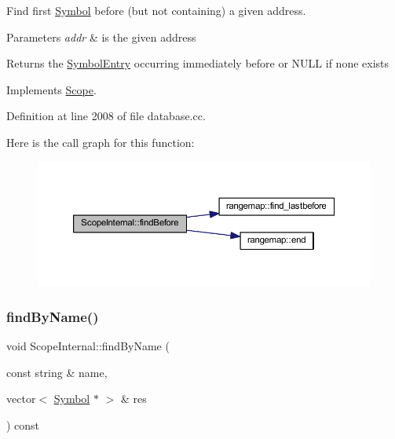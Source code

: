 Find first \mbox{\hyperlink{class_symbol}{Symbol}} before (but not containing) a given address. 


\begin{DoxyParams}{Parameters}
{\em addr} & is the given address \\
\hline
\end{DoxyParams}
\begin{DoxyReturn}{Returns}
the \mbox{\hyperlink{class_symbol_entry}{Symbol\+Entry}} occurring immediately before or N\+U\+LL if none exists 
\end{DoxyReturn}


Implements \mbox{\hyperlink{class_scope_a1c2e83ba66c61b449d85b492b1539625}{Scope}}.



Definition at line 2008 of file database.\+cc.

Here is the call graph for this function\+:
\nopagebreak
\begin{figure}[H]
\begin{center}
\leavevmode
\includegraphics[width=350pt]{class_scope_internal_a28ae6dd136a8b285c667206417ec14a5_cgraph}
\end{center}
\end{figure}
\mbox{\label{class_scope_internal_a06599bc2d7c1ccfd18f0e91a5ee956ca}} 
\subsubsection{\texorpdfstring{findByName()}{findByName()}}
{\footnotesize\ttfamily void Scope\+Internal\+::find\+By\+Name (\begin{DoxyParamCaption}\item[{const string \&}]{name,  }\item[{vector$<$ \mbox{\hyperlink{class_symbol}{Symbol}} $\ast$ $>$ \&}]{res }\end{DoxyParamCaption}) const\hspace{0.3cm}{\ttfamily [virtual]}}



